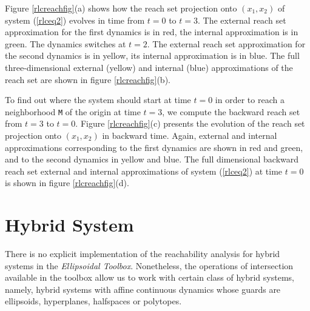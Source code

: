 Figure \ref{rlcreachfig}(a) shows how the reach set projection
onto $(x_1, x_2)$ of system (\ref{rlceq2})
evolves in time from $t=0$  to $t=3$. The external reach set approximation
for the first dynamics is in red, the internal approximation is in green.
The dynamics switches at $t=2$.
The external reach set approximation for the second dynamics is in yellow,
its internal approximation is in blue.
The full three-dimensional external (yellow) and internal (blue)
approximations of the reach set are shown in figure \ref{rlcreachfig}(b).


To find out where the system should start at time $t=0$ in order to reach
a neighborhood {\tt M} of the origin at time $t=3$,
we compute the backward reach set from $t=3$ to $t=0$.
Figure \ref{rlcreachfig}(c) presents the evolution of the reach set
projection onto $(x_1, x_2)$ in backward time.
Again, external and internal approximations corresponding
to the first dynamics are shown in red and green, and
to the second dynamics in yellow and blue. The
full dimensional backward reach set external and internal
approximations of system (\ref{rlceq2})
at time $t=0$ is shown in figure \ref{rlcreachfig}(d).



\section{Hybrid System}
There is no explicit implementation of the reachability analysis for hybrid
systems in the {\it Ellipsoidal Toolbox}.
Nonetheless, the operations of intersection available in the toolbox allow us
to work with certain class of hybrid systems, namely,
hybrid systems with affine continuous dynamics whose guards are
ellipsoids, hyperplanes, halfspaces or polytopes.

